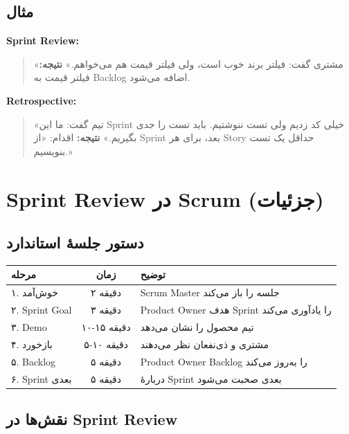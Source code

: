 \documentclass[12pt, a4paper]{article}
\begin{document}
\subsection{مثال}

\textbf{Sprint Review:}
\begin{quote}
«مشتری گفت: فیلتر برند خوب است، ولی فیلتر قیمت هم می‌خواهم.»
\textbf{نتیجه:} فیلتر قیمت به Backlog اضافه می‌شود.
\end{quote}

\textbf{Retrospective:}
\begin{quote}
«تیم گفت: ما این Sprint خیلی کد زدیم ولی تست ننوشتیم. باید تست را جدی 
بگیریم.»
\textbf{نتیجه:} اقدام: «از Sprint بعد، برای هر Story حداقل یک تست 
بنویسیم.»
\end{quote}

\section{Sprint Review در Scrum (جزئیات)}

\subsection{دستور جلسهٔ استاندارد}

\begin{center}
\begin{tabular}{|l|c|p{8cm}|}
\hline
\textbf{مرحله} & \textbf{زمان} & \textbf{توضیح} \\
\hline
۱. خوش‌آمد & ۲ دقیقه & Scrum Master جلسه را باز می‌کند \\
\hline
۲. Sprint Goal & ۳ دقیقه & Product Owner هدف Sprint را یادآوری می‌کند \\
\hline
۳. Demo & ۱۰-۱۵ دقیقه & تیم محصول را نشان می‌دهد \\
\hline
۴. بازخورد & ۵-۱۰ دقیقه & مشتری و ذی‌نفعان نظر می‌دهند \\
\hline
۵. Backlog & ۵ دقیقه & Product Owner Backlog را به‌روز می‌کند \\
\hline
۶. Sprint بعدی & ۵ دقیقه & دربارهٔ Sprint بعدی صحبت می‌شود \\
\hline
\end{tabular}
\end{center}

\subsection{نقش‌ها در Sprint Review}
\end{document}

